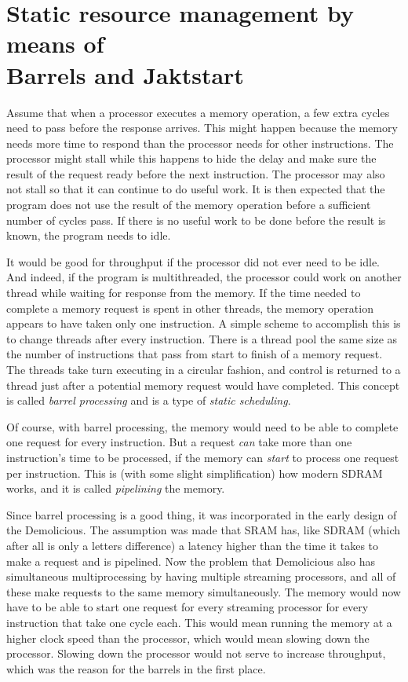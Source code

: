 \documentclass[../main/report.tex]{subfiles}
\begin{document}
\section{Static resource management by means of\\
Barrels and Jaktstart}

Assume that when a processor executes a memory operation, a few extra cycles need to pass before the response arrives.
This might happen because the memory needs more time to respond than the processor needs for other instructions.
The processor might stall while this happens to hide the delay and make sure the result of the request ready before the next instruction.
The processor may also not stall so that it can continue to do useful work.
It is then expected that the program does not use the result of the memory operation before a sufficient number of cycles pass.
If there is no useful work to be done before the result is known, the program needs to idle.

It would be good for throughput if the processor did not ever need to be idle.
And indeed, if the program is multithreaded, the processor could work on another thread while waiting for response from the memory.
If the time needed to complete a memory request is spent in other threads, the memory operation appears to have taken only one instruction.
A simple scheme to accomplish this is to change threads after every instruction.
There is a thread pool the same size as the number of instructions that pass from start to finish of a memory request.
The threads take turn executing in a circular fashion, and control is returned to a thread just after a potential memory request would have completed.
This concept is called \emph{barrel processing} and is a type of \emph{static scheduling}.

Of course, with barrel processing, the memory would need to be able to complete one request for every instruction.
But a request \emph{can} take more than one instruction's time to be processed, if the memory can \emph{start} to process one request per instruction.
This is (with some slight simplification) how modern SDRAM works, and it is called \emph{pipelining} the memory.

Since barrel processing is a good thing\texttrademark, it was incorporated in the early design of the Demolicious.
The assumption was made that SRAM has, like SDRAM (which after all is only a letters difference) a latency higher than the time it takes to make a request and is pipelined.
Now the problem that Demolicious also has simultaneous multiprocessing by having multiple streaming processors, and all of these make requests to the same memory simultaneously.
The memory would now have to be able to start one request for every streaming processor for every instruction that take one cycle each.
This would mean running the memory at a higher clock speed than the processor, which would mean slowing down the processor.
Slowing down the processor would not serve to increase throughput, which was the reason for the barrels in the first place.
\end{document}

